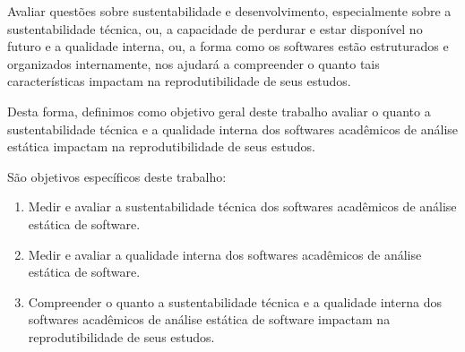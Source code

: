 %

Avaliar questões sobre sustentabilidade e desenvolvimento, especialmente sobre
a sustentabilidade técnica, ou, a capacidade de perdurar e estar disponível no
futuro e a qualidade interna, ou, a forma como os softwares estão estruturados
e organizados internamente, nos ajudará a compreender o quanto tais
características impactam na reprodutibilidade de seus estudos.

Desta forma, definimos como objetivo geral deste trabalho avaliar o quanto a
sustentabilidade técnica e a qualidade interna dos softwares acadêmicos de
análise estática impactam na reprodutibilidade de seus estudos.

São objetivos específicos deste trabalho:

\begin{enumerate}
  \item Medir e avaliar a sustentabilidade técnica dos softwares acadêmicos de
        análise estática de software.
  \item Medir e avaliar a qualidade interna dos softwares acadêmicos de análise
        estática de software.
  \item Compreender o quanto a sustentabilidade técnica e a qualidade interna
        dos softwares acadêmicos de análise estática de software impactam na
        reprodutibilidade de seus estudos.
\end{enumerate}

